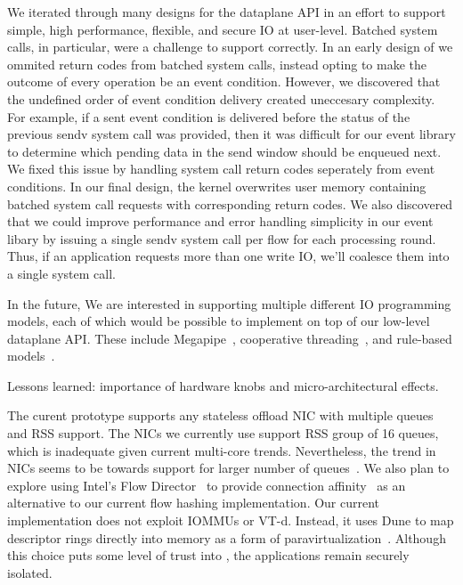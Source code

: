   We iterated through
many designs for the \ix dataplane API in an effort to
support simple, high performance, flexible, and secure IO at user-level.
Batched system calls, in particular, were a challenge to support
correctly. In an early design of \ix we ommited return codes from
batched system calls, instead opting to make the outcome of every operation be
an event condition. However, we discovered that the undefined order
of event condition delivery created uneccesary complexity. For example, if a
sent event condition is delivered before the status of the previous sendv system call
was provided, then it was difficult for our event library to determine
which pending data in the send window should be enqueued next. We
fixed this issue by handling system call return codes seperately from
event conditions. In our final design, the kernel overwrites user memory
containing batched system call requests with corresponding return
codes. We also discovered that we could improve performance and error
handling simplicity in our event libary by issuing a single sendv system
call per flow for each processing round. Thus, if an application
requests more than one write IO, we'll coalesce them into a single
system call.

In the future, We are interested in supporting multiple different IO programming
models, each of which would be possible to implement on top of our low-level
dataplane API. These include Megapipe~\cite{han2012megapipe},
cooperative threading~\cite{capriccio}, and rule-based models~\cite{stutsman_2013}.

\todo Lessons learned: importance of hardware knobs and
micro-architectural effects.  

 The curent prototype
supports any stateless offload NIC with multiple queues and RSS
support. The NICs we currently use support RSS group of 16 queues,
which is inadequate given current multi-core trends. Nevertheless, the
trend in NICs seems to be towards support for larger number of
queues~\cite{refs,nsdi14}. We also plan to explore using Intel's Flow
Director~\cite{intel:82599} to provide connection
affinity~\cite{DBLP:conf/eurosys/PesterevSZM12} as an alternative to
our current flow hashing implementation. Our current implementation
does not exploit IOMMUs or VT-d. Instead, it uses Dune to map
descriptor rings directly into \ix memory as a form of
paravirtualization~\cite{DBLP:conf/sosp/BarhamDFHHHN03}.  Although
this choice puts some level of trust into \ix, the applications remain
securely isolated.  

